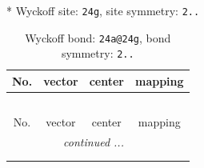 \documentclass[fleqn,8pt]{jsarticle}
\begin{document}
* Wyckoff site: {\tt 24g}, site symmetry: {\tt 2..}
\renewcommand{\arraystretch}{1.2}
\begin{longtable}{cccc}
\caption{Wyckoff bond: {\tt 24a@24g}, bond symmetry: {\tt 2..}}
 \\
 \hline \hline
No. & vector & center & mapping \\ \hline \endfirsthead

\multicolumn{3}{l}{\tablename\ \thetable{}} \\
 \hline \hline
No. & vector & center & mapping \\ \hline \endhead

 \hline \hline
\multicolumn{3}{r}{\footnotesize\it continued ...} \\ \endfoot

 \hline \hline
\multicolumn{3}{r}{} \\ \endlastfoot


\end{longtable}
\end{document}
